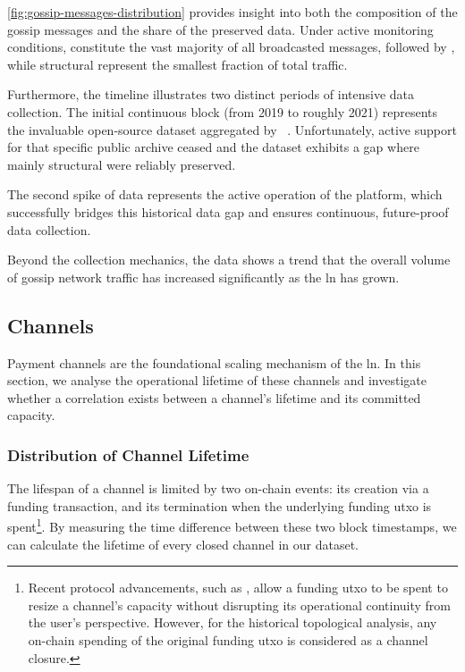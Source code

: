 \autoref{fig:gossip-messages-distribution} provides insight into both the composition of the gossip messages and the share of the preserved data. 
Under active monitoring conditions,  constitute the vast majority of all broadcasted messages, 
followed by , while structural  
represent the smallest fraction of total traffic. 

Furthermore, the timeline illustrates two distinct periods of intensive data collection. 
The initial continuous block (from 2019 to roughly 2021) represents the invaluable open-source dataset 
aggregated by \citeauthor{decker_lnresearch_2020}~\cite{decker_lnresearch_2020}. 
Unfortunately, active support for that specific public archive ceased and 
the dataset exhibits a gap where mainly structural  were reliably preserved.

The second spike of data represents the active operation of the  platform, 
which successfully bridges this historical data gap and ensures continuous, future-proof data collection. 

Beyond the collection mechanics, the data shows a trend that the overall volume of gossip 
network traffic has increased significantly as the \gls{ln} has grown.


\subsection{Channels}

Payment channels are the foundational scaling mechanism of the \gls{ln}. 
In this section, we analyse the operational lifetime of these channels and investigate 
whether a correlation exists between a channel's lifetime and its committed capacity.

\subsubsection{Distribution of Channel Lifetime}

The lifespan of a channel is limited by two on-chain events: 
its creation via a funding transaction, and its termination when the underlying funding \gls{utxo} is 
spent\footnote{Recent protocol advancements, such as , allow a funding \gls{utxo} 
to be spent to resize a channel's capacity without disrupting its operational continuity from the user's perspective. 
However, for the historical topological analysis, any on-chain spending of the original funding \gls{utxo} is considered as a channel closure.}. 
By measuring the time difference between these two block timestamps, we can calculate the lifetime of every closed channel in our dataset.

